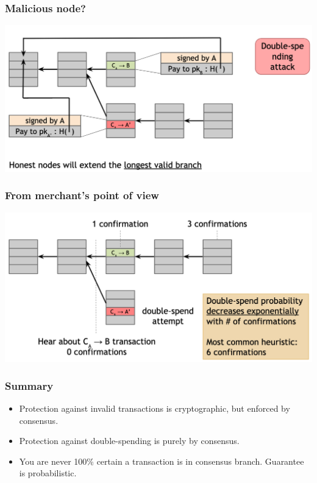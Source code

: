 \documentclass{beamer}
\begin{document}
\begin{frame}
  \frametitle{Malicious node?}
  \centering
	\includegraphics[scale=0.6]{attack}
\end{frame}
\begin{frame}
  \frametitle{From merchant's point of view}
  \centering
	\includegraphics[scale=0.6]{double_spend}
\end{frame}
\begin{frame}
  \frametitle{Summary}
	\begin{itemize}
		\item Protection against invalid transactions is cryptographic, 
but enforced by consensus.
		\item Protection against double-spending is purely by consensus.
		\item You are never 100\% certain a transaction is in consensus branch. Guarantee is probabilistic.
	\end{itemize}
\end{frame}
\end{document}
